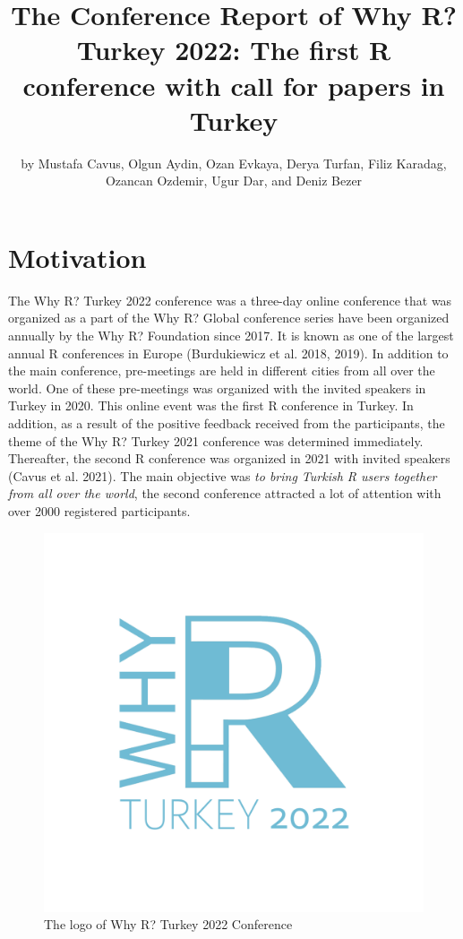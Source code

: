 \title{The Conference Report of Why R? Turkey 2022: The first R conference with call for papers in Turkey}
\author{by Mustafa Cavus, Olgun Aydin, Ozan Evkaya, Derya Turfan, Filiz Karadag, Ozancan Ozdemir, Ugur Dar, and Deniz Bezer}

\maketitle


\hypertarget{motivation}{%
\section{Motivation}\label{motivation}}

The Why R? Turkey 2022 conference was a three-day online conference that was organized as a part of the Why R? Global conference series have been organized annually by the Why R? Foundation since 2017. It is known as one of the largest annual R conferences in Europe (Burdukiewicz et al. 2018, 2019). In addition to the main conference, pre-meetings are held in different cities from all over the world. One of these pre-meetings was organized with the invited speakers in Turkey in 2020. This online event was the first R conference in Turkey. In addition, as a result of the positive feedback received from the participants, the theme of the Why R? Turkey 2021 conference was determined immediately. Thereafter, the second R conference was organized in 2021 with invited speakers (Cavus et al. 2021). The main objective was \emph{to bring Turkish R users together from all over the world}, the second conference attracted a lot of attention with over 2000 registered participants.

\begin{figure}

{\centering \includegraphics[width=0.4\linewidth]{figure1} 

}

\caption{The logo of Why R? Turkey 2022 Conference}\label{fig:figure1}
\end{figure}

